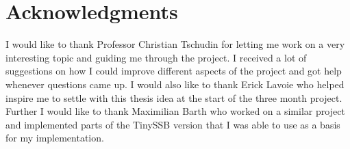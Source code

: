 \chapter{Acknowledgments}
I would like to thank Professor Christian Tschudin for letting me work on a very interesting topic and guiding me through the project. I received a lot of suggestions on how I could improve different aspects of the project and got help whenever questions came up. I would also like to thank Erick Lavoie who helped inspire me to settle with this thesis idea at the start of the three month project. Further I would like to thank Maximilian Barth who worked on a similar project and implemented parts of the TinySSB version that I was able to use as a basis for my implementation.